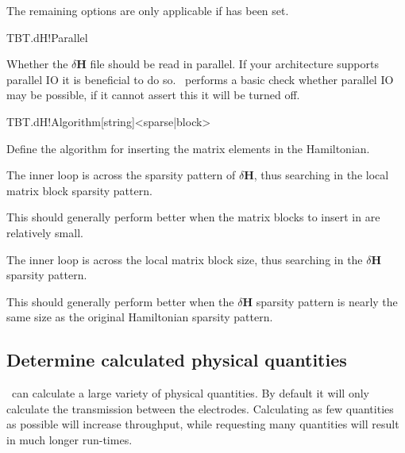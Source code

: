 The remaining options are only applicable if  has been
set. 

\begin{fdflogicalT}{TBT.dH!Parallel}

  Whether the $\delta\mathbf H$ file should be read in parallel. If
  your architecture supports parallel IO it is beneficial to do so. 
  \tbtrans\ performs a basic check whether parallel IO may be
  possible, if it cannot assert this it will be turned off.
  
\end{fdflogicalT}

\begin{fdfentry}{TBT.dH!Algorithm}[string]<sparse|block>

  Define the algorithm for inserting the matrix elements in the
  Hamiltonian.

  \begin{fdfoptions}

    \option[sparse]%
    The inner loop is across the sparsity pattern of $\delta\mathbf
    H$, thus searching in the local matrix block sparsity pattern.  
    
    This should generally perform better when the matrix blocks to
    insert in are relatively small. 

    \option[block]%
    The inner loop is across the local matrix block size, thus
    searching in the $\delta\mathbf H$ sparsity pattern.

    This should generally perform better when the $\delta\mathbf H$
    sparsity pattern is nearly the same size as the original
    Hamiltonian sparsity pattern.

  \end{fdfoptions}
  
\end{fdfentry}


\subsection{Determine calculated physical quantities}
\label{sec:physical}

\tbtrans\ can calculate a large variety of physical
quantities. By default it will only calculate the transmission between
the electrodes. Calculating as few quantities as possible will
increase throughput, while requesting many quantities will result in
much longer run-times.

